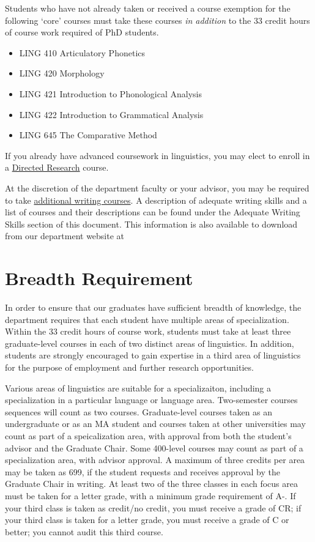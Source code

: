 \documentclass[
]{book}
\providecommand{\tightlist}{%
  \setlength{\itemsep}{0pt}\setlength{\parskip}{0pt}}
\begin{document}
Students who have not already taken or received a course exemption for the following `core' courses must take these courses \emph{in addition} to the 33 credit hours of course work required of PhD students.

\begin{itemize}
\tightlist
\item
  LING 410 Articulatory Phonetics
\item
  LING 420 Morphology
\item
  LING 421 Introduction to Phonological Analysis
\item
  LING 422 Introduction to Grammatical Analysis
\item
  LING 645 The Comparative Method
\end{itemize}

If you already have advanced coursework in linguistics, you may elect to enroll in a \hyperref[ling699]{Directed Research} course.

At the discretion of the department faculty or your advisor, you may be required to take \hyperref[writing]{additional writing courses}. A description of adequate writing skills and a list of courses and their descriptions can be found under the Adequate Writing Skills section of this document. This information is also available to download from our department website at

\section{Breadth Requirement}\label{breadth}

In order to ensure that our graduates have sufficient breadth of knowledge, the department requires that each student have multiple areas of specialization. Within the 33 credit hours of course work, students must take at least three graduate-level courses in each of two distinct areas of linguistics. In addition, students are strongly encouraged to gain expertise in a third area of linguistics for the purpose of employment and further research opportunities.

Various areas of linguistics are suitable for a specializaiton, including a specialization in a particular language or language area. Two-semester courses sequences will count as two courses. Graduate-level courses taken as an undergraduate or as an MA student and courses taken at other universities may count as part of a speicalization area, with approval from both the student's advisor and the Graduate Chair. Some 400-level courses may count as part of a specialization area, with advisor approval. A maximum of three credits per area may be taken as 699, if the student requests and receives approval by the Graduate Chair in writing. At least two of the three classes in each focus area must be taken for a letter grade, with a minimum grade requirement of A-. If your third class is taken as credit/no credit, you must receive a grade of CR; if your third class is taken for a letter grade, you must receive a grade of C or better; you cannot audit this third course.
\end{document}
